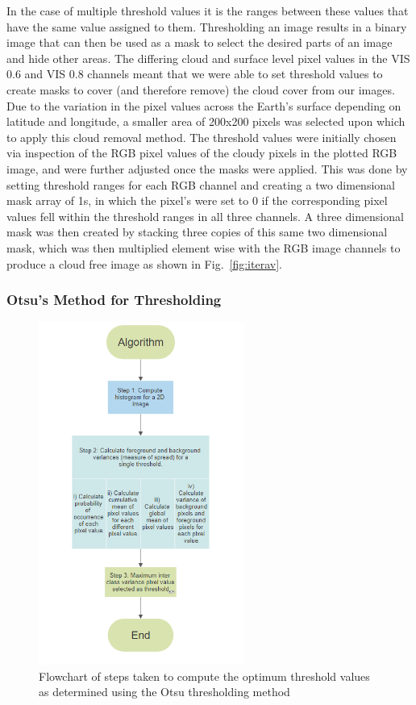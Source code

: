  In the case of multiple threshold values it is the ranges between these values that have the same value assigned to them. Thresholding an image results in a binary image that can then be used as a mask to select the desired parts of an image and hide other areas. The differing cloud and surface level pixel values in the VIS 0.6 and VIS 0.8 channels meant that we were able to set threshold values to create masks to cover (and therefore remove) the cloud cover from our images. Due to the variation in the pixel values across the Earth's surface depending on latitude and longitude, a smaller area of 200x200 pixels was selected upon which to apply this cloud removal method. The threshold values were initially chosen via inspection of the RGB pixel values of the cloudy pixels in the plotted RGB image, and were further adjusted once the masks were applied. This was done by setting threshold ranges for each RGB channel and creating a two dimensional mask array of 1s,  in which the pixel's were set to 0 if the corresponding pixel values fell within the threshold ranges in all three channels. A three dimensional mask was then created by stacking three copies of this same two dimensional mask, which was then multiplied element wise with the RGB image channels to produce a cloud free image as shown in Fig.~\ref{fig:iterav}. 
 
\subsubsection{Otsu's Method for Thresholding}

\begin{figure}
    \includegraphics[width=0.6\textwidth]{flowchart_otsu.png}
    \caption{\label{fig:flowchart} Flowchart of steps taken to compute the optimum threshold values as determined using the Otsu thresholding method}
\end{figure}

